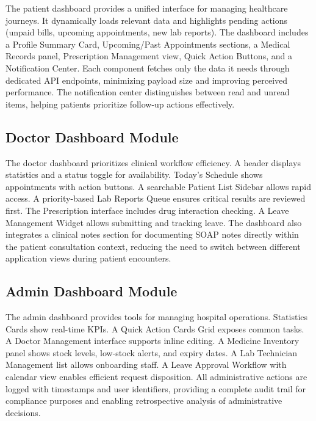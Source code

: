 \justifying
\noindent The patient dashboard provides a unified interface for managing healthcare journeys. It dynamically loads relevant data and highlights pending actions (unpaid bills, upcoming appointments, new lab reports). The dashboard includes a Profile Summary Card, Upcoming/Past Appointments sections, a Medical Records panel, Prescription Management view, Quick Action Buttons, and a Notification Center. Each component fetches only the data it needs through dedicated API endpoints, minimizing payload size and improving perceived performance. The notification center distinguishes between read and unread items, helping patients prioritize follow-up actions effectively.

\subsection{Doctor Dashboard Module}

\justifying
\noindent The doctor dashboard prioritizes clinical workflow efficiency. A header displays statistics and a status toggle for availability. Today's Schedule shows appointments with action buttons. A searchable Patient List Sidebar allows rapid access. A priority-based Lab Reports Queue ensures critical results are reviewed first. The Prescription interface includes drug interaction checking. A Leave Management Widget allows submitting and tracking leave. The dashboard also integrates a clinical notes section for documenting SOAP notes directly within the patient consultation context, reducing the need to switch between different application views during patient encounters.

\subsection{Admin Dashboard Module}

\justifying
\noindent The admin dashboard provides tools for managing hospital operations. Statistics Cards show real-time KPIs. A Quick Action Cards Grid exposes common tasks. A Doctor Management interface supports inline editing. A Medicine Inventory panel shows stock levels, low-stock alerts, and expiry dates. A Lab Technician Management list allows onboarding staff. A Leave Approval Workflow with calendar view enables efficient request disposition. All administrative actions are logged with timestamps and user identifiers, providing a complete audit trail for compliance purposes and enabling retrospective analysis of administrative decisions.

